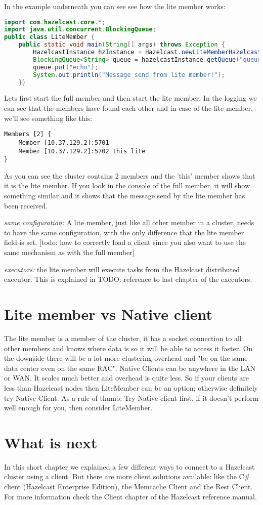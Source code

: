 In the example underneath you can see see how the lite member works:
\begin{lstlisting}[language=java]
import com.hazelcast.core.*;
import java.util.concurrent.BlockingQueue;
public class LiteMember {
    public static void main(String[] args) throws Exception {
        HazelcastInstance hzInstance = Hazelcast.newLiteMemberHazelcastInstance();
        BlockingQueue<String> queue = hazelcastInstance.getQueue("queue");
        queue.put("echo");
        System.out.println("Message send from lite member!");
    }}
\end{lstlisting}
Lets first start the full member and then start the lite member. In the logging we can see that the members have found each other and in case of the lite member, we'll see something like this:
\begin{verbatim}
Members [2] {
    Member [10.37.129.2]:5701
    Member [10.37.129.2]:5702 this lite
}	
\end{verbatim}	
As you can see the cluster contains 2 members and the 'this' member shows that it is the lite member. If you look in the console of the full member, it will show something similar and it shows that the message send by the lite member has been received.

\emph{same configuration:} A lite member, just like all other member in a cluster, needs to have the same configuration, with the only difference that the lite member field is set. [todo: how to correctly load a client since you also want to use the same mechanism as with the full member]

\emph{executors:} the lite member will execute tasks from the Hazelcast distributed executor. This is explained in TODO: reference to last chapter of the executors.

\section{Lite member vs Native client}
The lite member is a member of the cluster, it has a socket connection to all other members and knows where data is so it will be able to access it faster. On the downside there will be a lot more clustering overhead and "be on the same data center even on the same RAC". Native Clients can be anywhere in the LAN or WAN. It scales much better and overhead is quite less. So if your clients are less than Hazelcast nodes then LiteMember can be an option; otherwise definitely try Native Client. As a rule of thumb: Try Native client first, if it doesn't perform well enough for you, then consider LiteMember.

\section{What is next}
In this short chapter we explained a few different ways to connect to a Hazelcast cluster using a client. But there are more client solutions available: like the C\# client (Hazelcast Enterprise Edition), the Memcache Client and the Rest Client. For more information check the Client chapter of the Hazelcast reference manual.